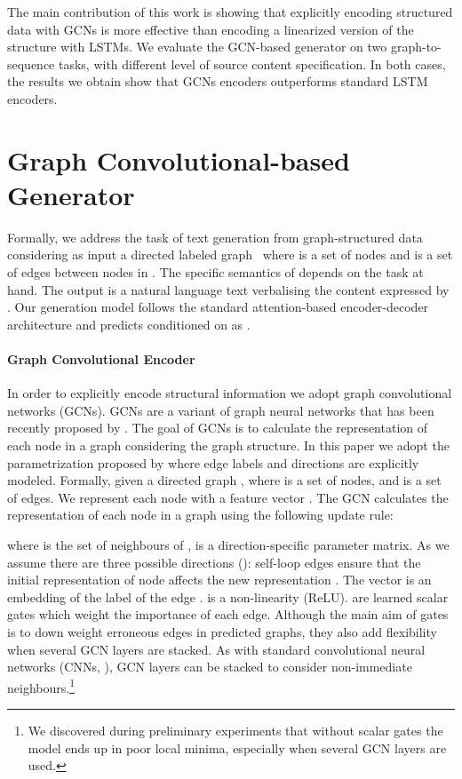 \documentclass[11pt,a4paper,dvipsnames]{article}
\begin{document}
The main contribution of this work is showing that explicitly encoding structured data with GCNs is more effective than encoding a linearized version of the structure with LSTMs.
We evaluate the GCN-based generator on two 
graph-to-sequence tasks, with different level of source content specification.
In both cases, the results we obtain show that GCNs encoders outperforms standard 
LSTM encoders. 



\section{Graph Convolutional-based Generator}
\label{sec:d2tmodel}


Formally, we address the task of text generation from 
graph-structured data considering as input a directed labeled 
graph~ where  is a set 
of nodes and  is a set of edges between nodes 
in . The specific semantics of  depends on the task at hand. 
The output  is a natural language text verbalising the content expressed by .
Our generation model follows the standard attention-based encoder-decoder 
architecture \cite{bahdanau2015neural,luong2015effective} and predicts 
conditioned on  as .


\paragraph{Graph Convolutional Encoder}
In order to explicitly encode structural information we adopt graph convolutional networks (GCNs).
GCNs are a variant of graph neural networks \cite{scarselli2009graph} that has been recently proposed by .
The goal of GCNs is to calculate the representation of each node in a graph considering the graph structure.
In this paper we adopt the parametrization proposed by  where edge labels and directions are explicitly modeled.
Formally, given a directed graph , where  is a set of nodes, and  is a set of edges. 
We represent each node  with a feature vector .
The GCN calculates the representation of each node  in a graph using the following update rule:
\vspace{-0.5em}

\noindent
where  is the set of neighbours of ,  is a direction-specific parameter matrix. 
As  we assume there are three possible directions (): self-loop edges ensure that the initial representation of node  affects the new representation . 
The vector  is an embedding of the label of the edge  
.  is a non-linearity (ReLU).
 are learned scalar gates which weight the importance of each edge.
Although the main aim of gates is to down weight erroneous edges in predicted graphs, they also add flexibility when several GCN layers are stacked.
As with standard convolutional neural networks (CNNs, \cite{lecun-01a}), GCN layers can be stacked to consider non-immediate neighbours.\footnote{We discovered during preliminary experiments that without scalar gates the model ends up in poor local minima, especially when several GCN layers are used.} 
\end{document}
